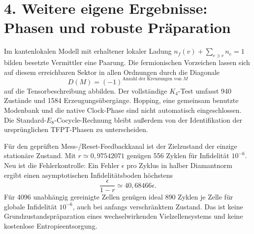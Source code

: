 \section*{4. Weitere eigene Ergebnisse: Phasen und robuste Präparation}
Im kantenlokalen Modell mit erhaltener lokaler Ladung $n_f(v)+\sum_{e\ni v}n_e=1$ bilden besetzte Vermittler eine Paarung. Die fermionischen Vorzeichen lassen sich auf diesem erreichbaren Sektor in allen Ordnungen durch die Diagonale
\begin{equation}
D(M)=(-1)^{\text{Anzahl der Kreuzungen von }M}
\end{equation}
auf die Tensorbeschreibung abbilden. Der vollständige $K_4$-Test umfasst 940 Zustände und 1584 Erzeugungsübergänge. Hopping, eine gemeinsam benutzte Modenbank und die native Clock-Phase sind nicht automatisch eingeschlossen. Die Standard-$E_8$-Cocycle-Rechnung bleibt außerdem von der Identifikation der ursprünglichen TFPT-Phasen zu unterscheiden.

Für den geprüften Mess-/Reset-Feedbackkanal ist der Zielzustand der einzige stationäre Zustand. Mit $r\simeq0{,}97542071$ genügen 556 Zyklen für Infidelität $10^{-6}$. Neu ist die Fehlerkontrolle: Ein Fehler $\epsilon$ pro Zyklus in halber Diamantnorm ergibt einen asymptotischen Infidelitätsboden höchstens
\begin{equation}
\frac{\epsilon}{1-r}\simeq40{,}68466\epsilon.
\end{equation}
Für 4096 unabhängig gereinigte Zellen genügen ideal 890 Zyklen je Zelle für globale Infidelität $10^{-6}$, auch bei anfangs verschränktem Zustand. Das ist keine Grundzustandspräparation eines wechselwirkenden Vielzellensystems und keine kostenlose Entropieentsorgung.

